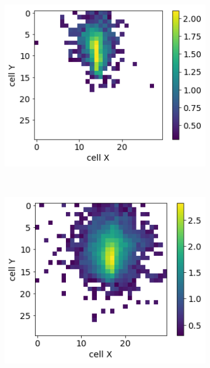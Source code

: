 \begin{figure}
\begin{subfigure}{0.24\textwidth}
  \end{subfigure}
  \begin{subfigure}{0.24\textwidth}
    \centering
    \includegraphics[width=1\textwidth]{figures/4_real.png}
  \end{subfigure}\\
   \begin{subfigure}{0.24\textwidth}
    \centering
    \includegraphics[width=1\textwidth]{figures/1_gen.png}

\end{subfigure}
\end{figure}
